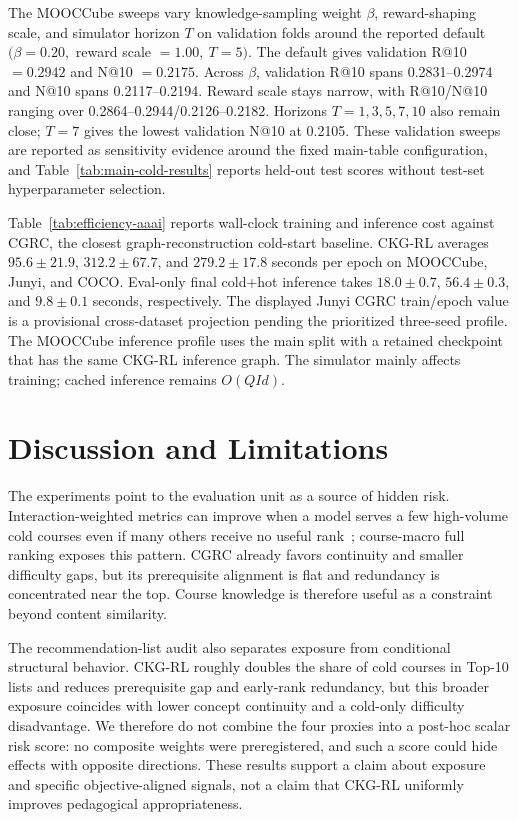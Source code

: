 \documentclass[letterpaper]{article}
\begin{document}
The MOOCCube sweeps vary knowledge-sampling weight \(\beta\), reward-shaping scale, and simulator horizon \(T\) on validation folds around the reported default \((\beta=0.20,\) reward scale \(=1.00,\ T=5)\). The default gives validation R@10 \(=0.2942\) and N@10 \(=0.2175\). Across \(\beta\), validation R@10 spans 0.2831--0.2974 and N@10 spans 0.2117--0.2194. Reward scale stays narrow, with R@10/N@10 ranging over 0.2864--0.2944/0.2126--0.2182. Horizons \(T=1,3,5,7,10\) also remain close; \(T=7\) gives the lowest validation N@10 at 0.2105. These validation sweeps are reported as sensitivity evidence around the fixed main-table configuration, and Table~\ref{tab:main-cold-results} reports held-out test scores without test-set hyperparameter selection.

Table~\ref{tab:efficiency-aaai} reports wall-clock training and inference cost against CGRC, the closest graph-reconstruction cold-start baseline. CKG-RL averages \(95.6\pm21.9\), \(312.2\pm67.7\), and \(279.2\pm17.8\) seconds per epoch on MOOCCube, Junyi, and COCO. Eval-only final cold+hot inference takes \(18.0\pm0.7\), \(56.4\pm0.3\), and \(9.8\pm0.1\) seconds, respectively. The displayed Junyi CGRC train/epoch value is a provisional cross-dataset projection pending the prioritized three-seed profile. The MOOCCube inference profile uses the main split with a retained checkpoint that has the same CKG-RL inference graph. The simulator mainly affects training; cached inference remains \(O(QId)\).



\section{Discussion and Limitations}
The experiments point to the evaluation unit as a source of hidden risk. Interaction-weighted metrics can improve when a model serves a few high-volume cold courses even if many others receive no useful rank~\cite{ekstrand2024distributional,bauer2024landscape}; course-macro full ranking exposes this pattern. CGRC already favors continuity and smaller difficulty gaps, but its prerequisite alignment is flat and redundancy is concentrated near the top. Course knowledge is therefore useful as a constraint beyond content similarity.

The recommendation-list audit also separates exposure from conditional structural behavior. CKG-RL roughly doubles the share of cold courses in Top-10 lists and reduces prerequisite gap and early-rank redundancy, but this broader exposure coincides with lower concept continuity and a cold-only difficulty disadvantage. We therefore do not combine the four proxies into a post-hoc scalar risk score: no composite weights were preregistered, and such a score could hide effects with opposite directions. These results support a claim about exposure and specific objective-aligned signals, not a claim that CKG-RL uniformly improves pedagogical appropriateness.
\end{document}
